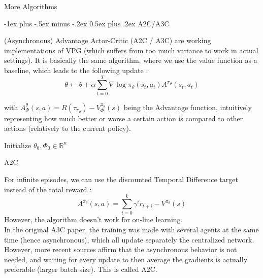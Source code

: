 \documentclass[10pt,landscape]{article}
\makeatletter
\renewcommand{\section}{\@startsection{section}{1}{0mm}%
                                {-1ex plus -.5ex minus -.2ex}%
                                {0.5ex plus .2ex}%
                                {\normalfont\large\bfseries}}
\makeatother
\begin{document}
\newpage

\begin{multicols}{3}

\begin{center}
     \Large{More Algorithms} \\
\end{center}



\section{A2C/A3C}

(Asynchronous) Advantage Actor-Critic (A2C / A3C) are working implementations of VPG (which suffers from too much variance to work in actual settings). It is basically the same algorithm, where we use the value function as a baseline, which leads to the following update :
$$ \theta \leftarrow \theta + \alpha \sum_{t=0}^T \nabla \log \pi_\theta (s_t, a_t) A^{\pi_\theta}(s_t, a_t) $$

with $ A^{\theta}_\Phi(s, a) = R(\tau_{\pi_\theta}) - V^{\pi_\theta}_\Phi(s)$ being the Advantage function, intuitively representing how much better or worse a certain action is compared to other actions (relatively to the current policy).\\

\smallskip

\begin{algorithm}[H]
 Initialize $\theta_0, \Phi_0 \in \mathbb{R}^n$\\
\caption{A2C}
\end{algorithm}

\medskip
For infinite episodes, we can use the discounted Temporal Difference target instead of the total reward : $$A^{\pi_\theta}(s, a) = \sum_{i=0}^{k} \gamma^i r_{t+i} - V^{\pi_\theta}(s)$$
However, the algorithm doesn't work for on-line learning.\\
\medskip
In the original A3C paper, the training was made with several agents at the same time (hence asynchronous), which all update separately the centralized network. However, more recent sources affirm that the asynchronous behavior is not needed, and waiting for every update to then average the gradients is actually preferable (larger batch size). This is called A2C.\\


\end{multicols}
\end{document}
